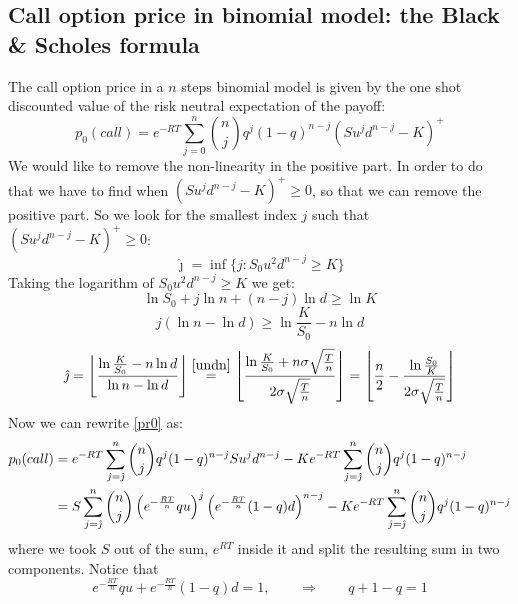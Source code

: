 \subsection[The Black \& Scholes formula]{Call option price in binomial model: the Black \& Scholes formula}
The call option price in a $n$ steps binomial model is given by the one shot discounted value of the risk neutral expectation of the payoff:
\begin{equation}\label{pr0}
    p_0(call)=e^{-RT}\sum^{n}_{j=0}\binom{n}{j}q^j(1-q)^{n-j}(Su^j d^{n-j}-K)^+
\end{equation}
We would like to remove the non-linearity in the positive part. In order to do that we have to find when $(Su^j d^{n-j}-K)^+\ge0$, so that we can remove the positive part. So we look for the smallest index $j$ such that $(Su^j d^{n-j}-K)^+\ge0$:
\begin{equation}
    \hat{\jmath} = \inf\{j:S_0u^2d^{n-j}\ge K\}
\end{equation}
Taking the logarithm of $S_0u^2d^{n-j}\ge K$ we get:
\begin{equation}
    \ln S_0 + j\ln n + (n-j)\ln d \ge \ln K
\end{equation}
\begin{equation}
    j(\ln n - \ln d) \ge \ln\dfrac{K}{S_0}-n\ln d
\end{equation}
\begin{equation}\label{jhat}
    \hat{\jmath} = \floor*{\dfrac{\ln\frac{K}{S_0}-n\ln d}{\ln n - \ln d}} \overset{\eqref{undn}}{=} \floor*{\dfrac{\ln\frac{K}{S_0}+n\sigma\sqrt{\frac{T}{n}}}{2\sigma\sqrt{\frac{T}{n}}}}=
    \floor*{\dfrac{n}{2}-\dfrac{\ln\frac{S_0}{K}}{2\sigma\sqrt{\frac{T}{n}}}}
\end{equation}
Now we can rewrite \eqref{pr0} as:
\begin{align}\label{pr01}
    \notag p_0(call)
    &=
    e^{-RT}\sum^{n}_{j=\hat{\jmath}}\binom{n}{j}q^j(1-q)^{n-j}Su^j d^{n-j}- Ke^{-RT}\sum^{n}_{j=\hat{\jmath}}\binom{n}{j}q^j(1-q)^{n-j}\\
    &=
    S\sum^{n}_{j=\hat{\jmath}}\binom{n}{j}\left(e^{-\frac{RT}{n}}qu\right)^j\left(e^{-\frac{RT}{n}}(1-q)d\right)^{n-j} - Ke^{-RT}\sum^{n}_{j=\hat{\jmath}}\binom{n}{j}q^j(1-q)^{n-j}
\end{align}
where we took $S$ out of the sum, $e^{RT}$ inside it and split the resulting sum in two components. Notice that
\begin{equation*}
    e^{-\frac{RT}{n}}qu + e^{-\frac{RT}{n}}(1-q)d=1, \qquad\Rightarrow\qquad q + 1-q = 1
\end{equation*}
